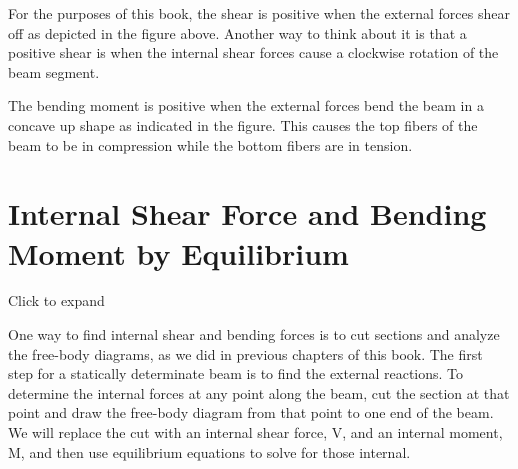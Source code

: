 \documentclass[
  letterpaper,
  DIV=11,
  numbers=noendperiod]{scrreprt}
\begin{document}
For the purposes of this book, the shear is positive when the external
forces shear off as depicted in the figure above. Another way to think
about it is that a positive shear is when the internal shear forces
cause a clockwise rotation of the beam segment.

The bending moment is positive when the external forces bend the beam in
a concave up shape as indicated in the figure. This causes the top
fibers of the beam to be in compression while the bottom fibers are in
tension.

\section{Internal Shear Force and Bending Moment by
Equilibrium}\label{sec-7.1}

Click to expand

One way to find internal shear and bending forces is to cut sections and
analyze the free-body diagrams, as we did in previous chapters of this
book. The first step for a statically determinate beam is to find the
external reactions. To determine the internal forces at any point along
the beam, cut the section at that point and draw the free-body diagram
from that point to one end of the beam. We will replace the cut with an
internal shear force, V, and an internal moment, M, and then use
equilibrium equations to solve for those internal.
\end{document}

